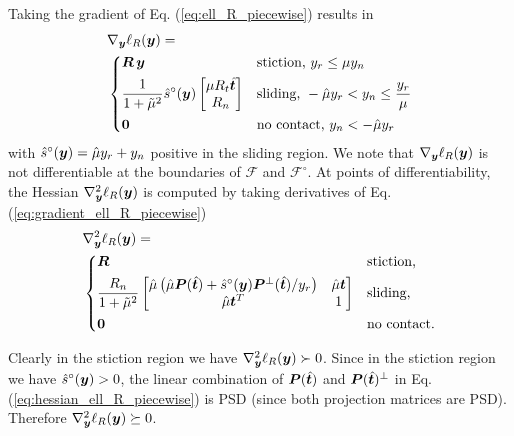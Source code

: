 Taking the gradient of Eq. (\ref{eq:ell_R_piecewise}) results in
\begin{align}
	&\nabla_\vf{y}\ell_R(\vf{y}) = 
	\label{eq:gradient_ell_R_piecewise}\\
&\begin{dcases}
	\vf{R}\,\vf{y} & 
	\text{stiction, } y_r \le \mu y_n\\
	\frac{1}{1+\tilde\mu^2}\hat{s}^\circ(\vf{y})\begin{bmatrix}
		\mu R_t\hat{\vf{t}}\\
		R_n\\
	\end{bmatrix} &
	\text{sliding, } -\hat\mu y_r < y_n \leq \frac{y_r}{\mu}\\
    \vf{0} & \text{no contact, } y_n < -\hat\mu y_r
\end{dcases}\nonumber
\end{align}
with $\hat{s}^\circ({\bm{y}}) = \hat{\mu}y_r+y_n$ positive in the sliding region. We note that $\nabla_{\bm{y}}\ell_R({\bm{y}})$ is not differentiable at the
boundaries of $\mathcal{F}$ and $\mathcal{F}^\circ$. At points of
differentiability, the Hessian $\nabla_{\bm{y}}^2\ell_R({\bm{y}})$ is computed by
taking derivatives of Eq. (\ref{eq:gradient_ell_R_piecewise})
\begin{align}
	&\nabla_\vf{y}^2\ell_R(\vf{y}) = 
	\label{eq:hessian_ell_R_piecewise}\\
&\begin{dcases}
	\vf{R} & 
	\text{stiction,}\\
	\frac{R_n}{1+\tilde\mu^2}
	\begin{bmatrix}
		\hat{\mu}\left(\hat{\mu}\vf{P}(\hat{\vf{t}})+\hat{s}^\circ(\vf{y})\vf{P}^\perp(\hat{\vf{t}})/y_r\right) & 
		\hat{\mu}\vf{t}\\
		\hat{\mu}\vf{t}^T & 
		1\\
	\end{bmatrix} &
	\text{sliding,}\\
    \vf{0} & \text{no contact.}
\end{dcases}\nonumber
\end{align}

Clearly in the stiction region we have $\nabla_{\bm{y}}^2\ell_R({\bm{y}})\succ 0$.
Since in the stiction region we have $\hat{s}^\circ({\bm{y}})>0$, the linear
combination of ${\bm{P}}(\hat{{\bm{t}}})$ and ${\bm{P}}(\hat{{\bm{t}}})^\perp$ in Eq.
(\ref{eq:hessian_ell_R_piecewise}) is PSD (since both projection matrices are
PSD). Therefore $\nabla_{\bm{y}}^2\ell_R({\bm{y}})\succeq 0$.

